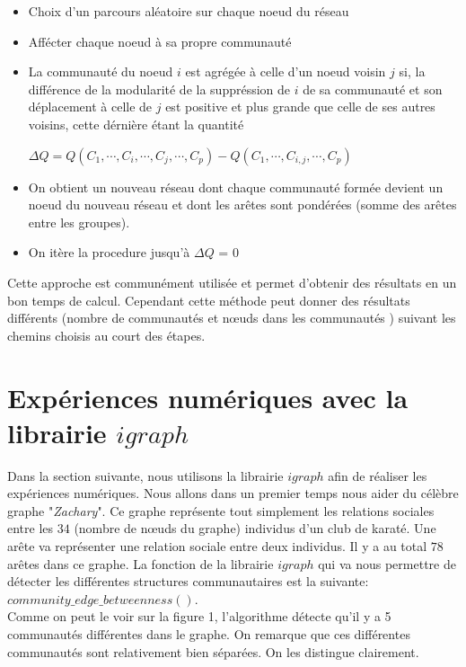 \documentclass[frenchb]{report}
\newcommand{\1}{\mathbbm{1}}
\theoremstyle{definition}\newtheorem{defn}{Définition}
\theoremstyle{definition}\newtheorem{exm}{Exemple}
\theoremstyle{definition}\newtheorem{nota}{Notation}
\theoremstyle{definition}\newtheorem{rem}{Remarque}
\begin{document}
\begin{itemize}
	
	\item Choix d'un parcours aléatoire sur chaque noeud du réseau
	
	\item Affécter chaque noeud à sa propre communauté
	
	\item La communauté du noeud $i$ est agrégée à celle d'un noeud voisin $j$ si, la différence de la modularité de la suppréssion de $i$ de sa communauté et son déplacement à celle de $j$ est positive et plus grande que celle de ses autres voisins, cette dérnière étant la quantité\newline
	
	$\Delta Q = Q(C_1, \cdots, C_i, \cdots, C_j, \cdots, C_p) - Q(C_1, \cdots, C_{i,j}, \cdots, C_p)$
	
	\item On obtient un nouveau réseau dont chaque communauté formée devient un noeud du nouveau réseau et dont les arêtes sont pondérées (somme des arêtes entre les groupes).
	
	\item On itère la procedure jusqu'à $\Delta Q$ = 0
	
\end{itemize}


Cette approche est communément utilisée et permet d'obtenir des résultats en un bon temps de calcul. Cependant cette méthode peut donner des résultats différents (nombre de communautés et nœuds dans les communautés ) suivant les chemins choisis au court des étapes. 



\section*{Expériences numériques avec la librairie $igraph$}


Dans la section suivante, nous utilisons la librairie $igraph$ afin de réaliser les expériences numériques. Nous allons dans un premier temps nous aider du célèbre graphe "\textit{Zachary}". Ce graphe représente tout simplement les relations sociales entre les $34$ (nombre de nœuds du graphe) individus d'un club de karaté. Une arête va représenter une relation sociale entre deux individus. Il y a au total $78$ arêtes dans ce graphe.
La fonction de la librairie $igraph$ qui va nous permettre de détecter les différentes structures communautaires est la suivante: $community\_edge\_betweenness()$. \\
Comme on peut le voir sur la figure 1, l'algorithme détecte qu'il y  a 5 communautés différentes dans le graphe. On remarque que ces différentes communautés sont relativement bien séparées. On les distingue clairement.
\end{document}
